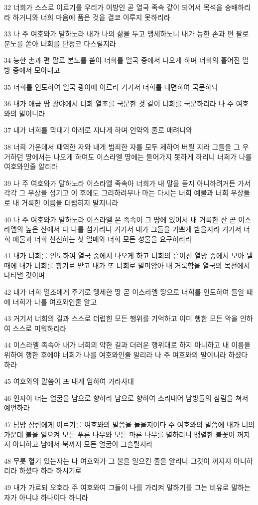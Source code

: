 \par 32 너희가 스스로 이르기를 우리가 이방인 곧 열국 족속 같이 되어서 목석을 숭배하리라 하거니와 너희 마음에 품은 것을 결코 이루지 못하리라
\par 33 나 주 여호와가 말하노라 내가 나의 삶을 두고 맹세하노니 내가 능한 손과 편 팔로 분노를 쏟아 너희를 단정코 다스릴지라
\par 34 능한 손과 편 팔로 본노를 쏟아 너희를 열국 중에서 나오게 하며 너희의 흩어진 열방 중에서 모아내고
\par 35 너희를 인도하여 열국 광야에 이르러 거기서 너희를 대면하여 국문하되
\par 36 내가 애굽 땅 광야에서 너희 열조를 국문한 것 같이 너희를 국문하리라 나 주 여호와의 말이니라
\par 37 내가 너희를 막대기 아래로 지나게 하며 언약의 줄로 매려니와
\par 38 너희 가운데서 패역한 자와 내게 범죄한 자를 모두 제하여 버릴 지라 그들을 그 우거하던 땅에서는 나오게 하여도 이스라엘 땅에는 들어가지 못하게 하리니 너희가 나를 여호와인줄 알리라
\par 39 나 주 여호와가 말하노라 이스라엘 족속아 너희가 내 말을 듣지 아니하려거든 가서 각각 그 우상을 섬기고 이 후에도 그리하려무나 마는 다시는 너희 예물과 너희 우상들로 내 거룩한 이름을 더럽히지 말지니라
\par 40 나 주 여호와가 말하노라 이스라엘 온 족속이 그 땅에 있어서 내 거룩한 산 곧 이스라엘의 높은 산에서 다 나를 섬기리니 거기서 내가 그들을 기쁘게 받을지라 거기서 너희 예물과 너희 천신하는 첫 열매와 너희 모든 성물을 요구하리라
\par 41 내가 너희를 인도하여 열국 중에서 나오게 하고 너희의 흩어진 열방 중에서 모아 낼 때에 내가 너희를 향기로 받고 내가 또 너희로 말미암아 내 거룩함을 열국의 목전에서 나타낼 것이며
\par 42 내가 너희 열조에게 주기로 맹세한 땅 곧 이스라엘 땅으로 너희를 인도하여 들일 때에 너희가 나를 여호와인줄 알고
\par 43 거기서 너희의 길과 스스로 더럽힌 모든 행위를 기억하고 이미 행한 모든 악을 인하여 스스로 미워하리라
\par 44 이스라엘 족속아 내가 너희의 악한 길과 더러운 행위대로 하지 아니하고 내 이름을 위하여 행한 후에야 너희가 나를 여호와인줄 알리라 나 주 여호와의 말이니라 하셨다 하라
\par 45 여호와의 말씀이 또 내게 임하여 가라사대
\par 46 인자야 너는 얼굴을 남으로 향하라 남으로 향하여 소리내어 남방들의 삼림을 쳐서 예언하라
\par 47 남방 삼림에게 이르기를 여호와의 말씀을 들을지어다 주 여호와의 말씀에 내가 너의 가운데 불을 일으켜 모든 푸른 나무와 모든 마른 나무를 멸하리니 맹렬한 불꽃이 꺼지지 아니하고 남에서 북까지 모든 얼굴이 그슬릴지라
\par 48 무릇 혈기 있는자는 나 여호와가 그 불을 일으킨 줄을 알리니 그것이 꺼지지 아니하리라 하셨다 하라 하시기로
\par 49 내가 가로되 오호라 주 여호와여 그들이 나를 가리켜 말하기를 그는 비유로 말하는 자가 아니냐 하나이다 하니라

